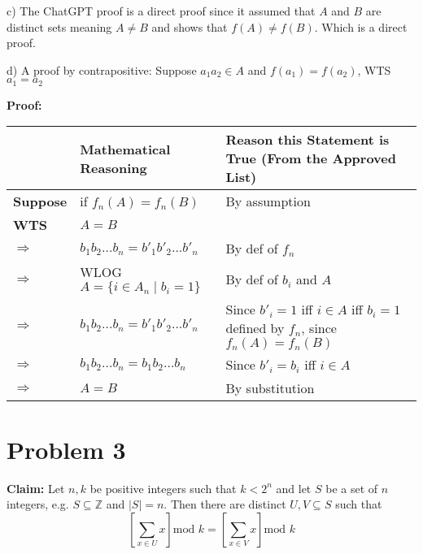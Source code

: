 \documentclass{article}
\begin{document}
c) The ChatGPT proof is a direct proof since it assumed that $A$ and $B$ are distinct sets meaning $A\neq B$ and shows that $f(A)\neq f(B)$.  Which is a direct proof.\vspace{10pt}
\pagebreak

d) A proof by contrapositive: Suppose $a_1a_2\in A$ and $f(a_1)=f(a_2)$, WTS $a_1=a_2$

\textbf{Proof:}
\begin{flushleft}
    \begin{tabular}{|p{1.5cm}|p{5.6cm}|p{6cm}|}
         \hline
         & \textbf{Mathematical Reasoning} & \textbf{Reason this Statement is True (From the Approved List)} \\
         \hline
         \textbf{Suppose} & if $f_n(A)=f_n(B)$ & By assumption \\
         \hline
         \textbf{WTS} & $A=B$ & \\
         \hline
         $\Rightarrow$ & $b_1b_2...b_n=b'_1b'_2...b'_n$ & By def of $f_n$ \\
         \hline
         $\Rightarrow$ & WLOG $A=\{i\in A_n\mid b_i=1\}$ & By def of $b_i$ and $A$ \\
         \hline
         $\Rightarrow$ & $b_1b_2...b_n=b'_1b'_2...b'_n$ & Since $b'_i=1$ iff $i\in A$ iff $b_i=1$ defined by $f_n$, since $f_n(A)=f_n(B)$\\
         \hline
         $\Rightarrow$ & $b_1b_2...b_n=b_1b_2...b_n$ & Since $b'_i=b_i$ iff $i\in A$ \\
         \hline
         $\Rightarrow$ & $A=B$ & By substitution \\
         \hline
    \end{tabular}
\end{flushleft}


\pagebreak


\section{Problem 3}

\textbf{Claim:} Let $n,k$ be positive integers such that $k<2^n$ and let $S$ be a set of $n$ integers, e.g. $S\subseteq \mathbb{Z}$ and $|S|=n$. Then there are distinct $U,V\subseteq S$ such that
\begin{equation}
    \left[\sum_{x\in U}^{}x\right]\text{mod } k = \left[\sum_{x\in V}^{}x\right]\text{mod } k
\end{equation}\vspace{10pt}
\end{document}
